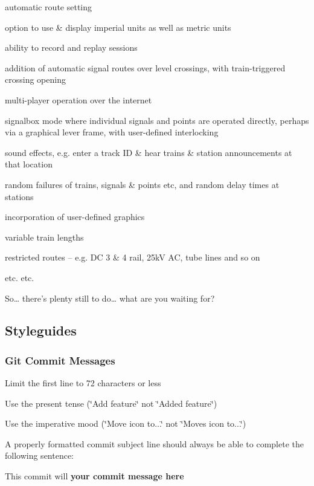 \begin{DoxyItemize}
\item automatic route setting
\item option to use \& display imperial units as well as metric units
\item ability to record and replay sessions
\item addition of automatic signal routes over level crossings, with train-\/triggered crossing opening
\item multi-\/player operation over the internet
\item signalbox mode where individual signals and points are operated directly, perhaps via a graphical lever frame, with user-\/defined interlocking
\item sound effects, e.\+g. enter a track ID \& hear trains \& station announcements at that location
\item random failures of trains, signals \& points etc, and random delay times at stations
\item incorporation of user-\/defined graphics
\item variable train lengths
\item restricted routes – e.\+g. DC 3 \& 4 rail, 25kV AC, tube lines and so on
\item etc. etc.
\end{DoxyItemize}

So… there’s plenty still to do… what are you waiting for?

\subsection*{Styleguides}

\subsubsection*{Git Commit Messages}


\begin{DoxyItemize}
\item Limit the first line to 72 characters or less
\item Use the present tense (\char`\"{}\+Add feature\char`\"{} not \char`\"{}\+Added feature\char`\"{})
\item Use the imperative mood (\char`\"{}\+Move icon to...\char`\"{} not \char`\"{}\+Moves icon to...\char`\"{})
\item A properly formatted commit subject line should always be able to complete the following sentence\+:
\begin{DoxyItemize}
\item This commit will {\bfseries your commit message here}
\end{DoxyItemize}
\end{DoxyItemize}

